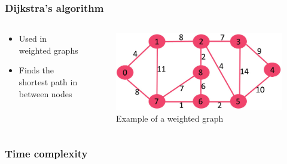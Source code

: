 \documentclass[pdf,fyma2]{beamer}
\begin{document}
\begin{frame}
    \frametitle{Dijkstra's algorithm}

    \begin{columns}

    \begin{column}{0.5\textwidth}
        \begin{itemize}
            \item Used in weighted graphs
            \item Finds the shortest path in between nodes
        \end{itemize}
    \end{column}
    
    \begin{column}{0.5\textwidth}
        \begin{figure}
            \includegraphics[width=\textwidth]{img/dijsktra_graph.jpg}
            \caption{Example of a weighted graph}
        \end{figure}
    \end{column}
    
    \end{columns}
    
\end{frame}

\begin{frame}
    \frametitle{Time complexity}
\end{frame}
\end{document}
